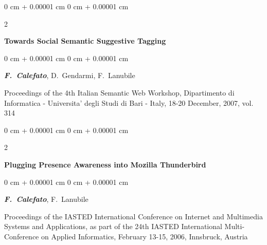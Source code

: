 \documentclass[10pt, a4paper]{article}
\newenvironment{onecolentry}{
    \begin{adjustwidth}{
        0 cm + 0.00001 cm
    }{
        0 cm + 0.00001 cm
    }
}{
    \end{adjustwidth}
} %
\newenvironment{twocolentry}[2][]{
    \onecolentry
    \def\secondColumn{#2}
    \setcolumnwidth{\fill, 4.5 cm}
    \begin{paracol}{2}
}{
    \switchcolumn \raggedleft \secondColumn
    \end{paracol}
    \endonecolentry
} %
\begin{document}
        \vspace{0.2 cm}

        \begin{samepage}
            \begin{twocolentry}{
                2007
            }
                \textbf{Towards Social Semantic Suggestive Tagging}
            \end{twocolentry}

            \vspace{0.10 cm}
            
            \begin{onecolentry}
                \mbox{\textbf{\textit{F. Calefato}}}, \mbox{D. Gendarmi}, \mbox{F. Lanubile}

                \vspace{0.10 cm}
                
        Proceedings of the 4th Italian Semantic Web Workshop, Dipartimento di Informatica - Universita' degli Studi di Bari - Italy, 18-20 December, 2007, vol. 314\end{onecolentry}
        \end{samepage}

        \vspace{0.2 cm}

        \begin{samepage}
            \begin{twocolentry}{
                2006
            }
                \textbf{Plugging Presence Awareness into Mozilla Thunderbird}
            \end{twocolentry}

            \vspace{0.10 cm}
            
            \begin{onecolentry}
                \mbox{\textbf{\textit{F. Calefato}}}, \mbox{F. Lanubile}

                \vspace{0.10 cm}
                
        Proceedings of the IASTED International Conference on Internet and Multimedia Systems and Applications, as part of the 24th IASTED International Multi-Conference on Applied Informatics, February 13-15, 2006, Innsbruck, Austria\end{onecolentry}
        \end{samepage}

        \vspace{0.2 cm}
\end{document}
